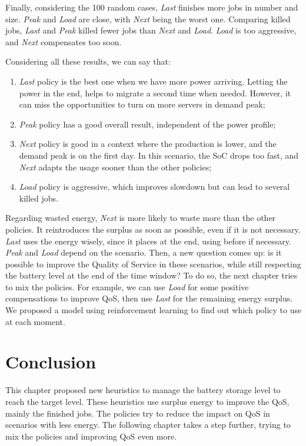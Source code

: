 Finally, considering the 100 random cases, \emph{Last} finishes more jobs in number and size. \emph{Peak} and \emph{Load} are close, with \emph{Next} being the worst one. Comparing killed jobs, \emph{Last} and \emph{Peak} killed fewer jobs than \emph{Next} and \emph{Load}. \emph{Load} is too aggressive, and \emph{Next} compensates too soon. 

Considering all these results, we can say that: 
\begin{enumerate}
    \item \emph{Last} policy is the best one when we have more power arriving. Letting the power in the end, helps to migrate a second time when needed. However, it can miss the opportunities to turn on more servers in demand peak;
    \item \emph{Peak} policy has a good overall result, independent of the power profile;
    \item \emph{Next} policy is good in a context where the production is lower, and the demand peak is on the first day. In this scenario, the SoC drops too fast, and \emph{Next} adapts the usage sooner than the other policies;
    \item \emph{Load} policy is aggressive, which improves slowdown but can lead to several killed jobs.
\end{enumerate}

Regarding wasted energy, \emph{Next} is more likely to waste more than the other policies. It reintroduces the surplus as soon as possible, even if it is not necessary. \emph{Last} uses the energy wisely, since it places at the end, using before if necessary. \emph{Peak} and \emph{Load} depend on the scenario. Then, a new question comes up: is it possible to improve the Quality of Service in these scenarios, while still respecting the battery level at the end of the time window? To do so, the next chapter tries to mix the policies. For example, we can use \emph{Load} for some positive compensations to improve QoS, then use \emph{Last} for the remaining energy surplus. We proposed a model using reinforcement learning to find out which policy to use at each moment.

\section{Conclusion}
This chapter proposed new heuristics to manage the battery storage level to reach the target level. These heuristics use surplus energy to improve the QoS, mainly the finished jobs. The policies try to reduce the impact on QoS in scenarios with less energy. The following chapter takes a step further, trying to mix the policies and improving QoS even more.